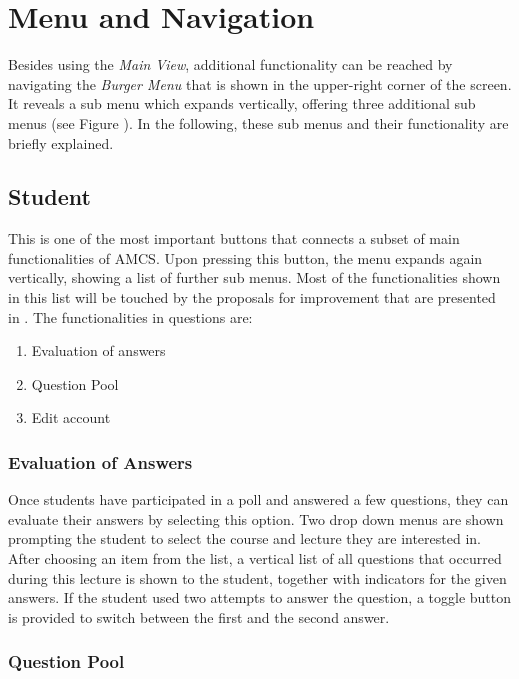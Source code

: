 \section{Menu and Navigation}
Besides using the \emph{Main View}, additional functionality can be reached by navigating the \emph{Burger Menu} that is shown in the upper-right corner of the screen. It reveals a sub menu which expands vertically, offering three additional sub menus (see Figure \todosct). In the following, these sub menus and their functionality are briefly explained.

\subsection{Student}

This is one of the most important buttons that connects a subset of main functionalities of AMCS. Upon pressing this button, the menu expands again vertically, showing a list of further sub menus. Most of the functionalities shown in this list will be touched by the proposals for improvement that are presented in . The functionalities in questions are:

\begin{enumerate}
	\item Evaluation of answers
	\item Question Pool
	\item Edit account
\end{enumerate}

\subsubsection{Evaluation of Answers}

Once students have participated in a poll and answered a few questions, they can evaluate their answers by selecting this option. Two drop down menus are shown prompting the student to select the course and lecture they are interested in. 
After choosing an item from the list, a vertical list of all questions that occurred during this lecture is shown to the student, together with indicators for the given answers.
If the student used two attempts to answer the question, a toggle button is provided to switch between the first and the second answer. \todogrf

\subsubsection{Question Pool}

